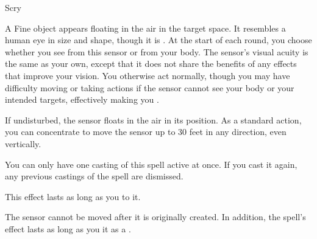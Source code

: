 \newpage
\begin{spellsection}{Scry}

\begin{spellheader}
\end{spellheader}

\begin{spellcontent}

\begin{spelltargetinginfo}




\end{spelltargetinginfo}


\begin{spelleffects}



\spelleffect
A Fine object appears floating in the air in the target space.
It resembles a human eye in size and shape, though it is .
At the start of each round, you choose whether you see from this sensor or from your body.
The sensor's visual acuity is the same as your own, except that it does not share the benefits of any  effects that improve your vision.
You otherwise act normally, though you may have difficulty moving or taking actions if the sensor cannot see your body or your intended targets, effectively making you \blinded.

If undisturbed, the sensor floats in the air in its position.
As a standard action, you can concentrate to move the sensor up to 30 feet in any direction, even vertically.

You can only have one casting of this spell active at once.
If you cast it again, any previous castings of the spell are dismissed.

This effect lasts as long as you  to it.








\end{spelleffects}

\end{spellcontent}
\begin{spellfooter}


\end{spellfooter}
\begin{spellsubcontent}


\begin{spellcantrip}

The sensor cannot be moved after it is originally created.
In addition, the spell's effect lasts as long as you  it as a .

\end{spellcantrip}


\end{spellsubcontent}
\end{spellsection}


